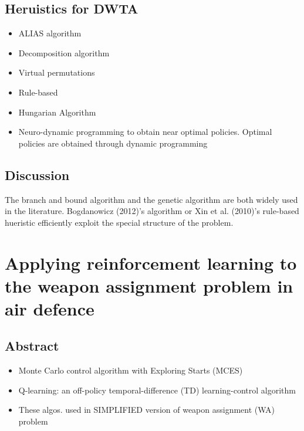 \documentclass[12pt]{article} %
\begin{document}
\subsection*{Heruistics for DWTA}

\begin{itemize}
    \item ALIAS algorithm 
    \item Decomposition algorithm 
    \item Virtual permutations
    \item Rule-based
    \item Hungarian Algorithm
    \item Neuro-dynamic programming to obtain near optimal policies. Optimal policies are obtained through dynamic programming
\end{itemize}

\subsection*{Discussion}
The branch and bound algorithm and the genetic algorithm are both widely used in the literature. Bogdanowicz (2012)'s algorithm or 
Xin et al. (2010)'s rule-based hueristic efficiently exploit the special structure of the problem.


\section*{Applying reinforcement learning to the weapon assignment problem in air defence \cite{rl_wa_airDefence_mouton_2011}}

\subsection*{Abstract}
\begin{itemize}
    \item Monte Carlo control algorithm with Exploring Starts (MCES)
    \item Q-learning: an off-policy temporal-difference (TD) learning-control algorithm
    \item These algos. used in SIMPLIFIED version of weapon assignment (WA) problem
\end{itemize}
\end{document}
